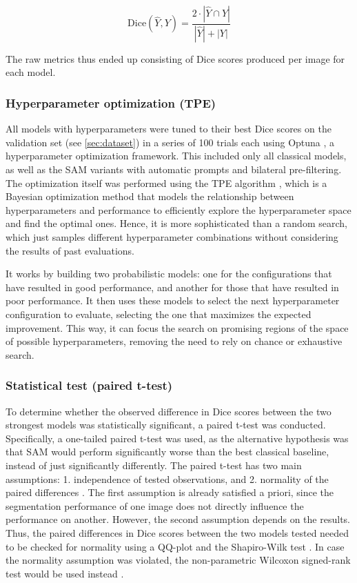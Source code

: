 $$ \mathrm{Dice}(\hat{Y}, Y) = \frac{2 \cdot | \hat{Y} \cap Y |}{|\hat{Y}| + |Y|} $$

\noindent The raw metrics thus ended up consisting of \acs{Dice} scores produced per image for each model.

\subsubsection{Hyperparameter optimization (\acs{TPE})}
\label{subsubsec:hyperparameter_optimization}
All models with hyperparameters were tuned to their best \acs{Dice} scores on the validation set (see \cref{sec:dataset}) in a series of 100 trials each using Optuna \parencite{optuna2019}, a hyperparameter optimization framework.
This included only all classical models, as well as the \acs{SAM} variants with automatic prompts and bilateral pre-filtering.
The optimization itself was performed using the \acf{TPE} algorithm \parencite{TPEHyperparameterOptimization2013,TPEHyperparameterOptimization2011},
which is a Bayesian optimization method that models the relationship between hyperparameters and performance to efficiently explore the hyperparameter space and find the optimal ones.
Hence, it is more sophisticated than a random search, which just samples different hyperparameter combinations without considering the results of past evaluations.

It works by building two probabilistic models: one for the configurations that have resulted in good performance, and another for those that have resulted in poor performance.
It then uses these models to select the next hyperparameter configuration to evaluate, selecting the one that maximizes the expected improvement.
This way, it can focus the search on promising regions of the space of possible hyperparameters, removing the need to rely on chance or exhaustive search.


\subsubsection{Statistical test (paired t-test)}
To determine whether the observed difference in \acs{Dice} scores between the two strongest models was statistically significant, a paired t-test was conducted.
Specifically, a one-tailed paired t-test was used, as the alternative hypothesis was that \acs{SAM} would perform significantly worse than the best classical baseline, instead of just significantly differently.
The paired t-test has two main assumptions: 1. independence of tested observations, and 2. normality of the paired differences \parencite{Rainio2024}.
The first assumption is already satisfied a priori, since the segmentation performance of one image does not directly influence the performance on another.
However, the second assumption depends on the results.
Thus, the paired differences in \acs{Dice} scores between the two models tested needed to be checked for normality using a QQ-plot and the Shapiro-Wilk test \parencite{ShapiroWilk1965}.
In case the normality assumption was violated, the non-parametric Wilcoxon signed-rank test would be used instead \parencite{Rainio2024}.

